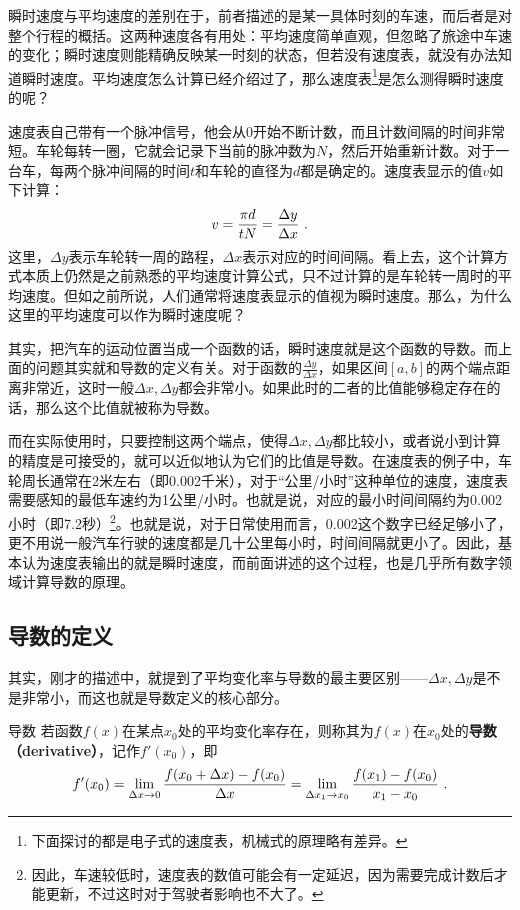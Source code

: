 瞬时速度与平均速度的差别在于，前者描述的是某一具体时刻的车速，而后者是对整个行程的概括。这两种速度各有用处：平均速度简单直观，但忽略了旅途中车速的变化；瞬时速度则能精确反映某一时刻的状态，但若没有速度表，就没有办法知道瞬时速度。平均速度怎么计算已经介绍过了，那么速度表\footnote{下面探讨的都是电子式的速度表，机械式的原理略有差异。}是怎么测得瞬时速度的呢？

速度表自己带有一个脉冲信号，他会从0开始不断计数，而且计数间隔的时间非常短。车轮每转一圈，它就会记录下当前的脉冲数为$N$，然后开始重新计数。对于一台车，每两个脉冲间隔的时间$t$和车轮的直径为$d$都是确定的。速度表显示的值$v$如下计算：
\begin{equation}
v={\pi d\over tN}=\frac{\Delta y}{\Delta x}~.
\end{equation}
这里，$\Delta y$表示车轮转一周的路程，$\Delta x$表示对应的时间间隔。看上去，这个计算方式本质上仍然是之前熟悉的平均速度计算公式，只不过计算的是车轮转一周时的平均速度。但如之前所说，人们通常将速度表显示的值视为瞬时速度。那么，为什么这里的平均速度可以作为瞬时速度呢？

其实，把汽车的运动位置当成一个函数的话，瞬时速度就是这个函数的导数。而上面的问题其实就和导数的定义有关。对于函数的$\displaystyle\frac{\Delta y}{\Delta x}$，如果区间$[a, b]$的两个端点距离非常近，这时一般$\Delta x,\Delta y$都会非常小。如果此时的二者的比值能够稳定存在的话，那么这个比值就被称为导数。

而在实际使用时，只要控制这两个端点，使得$\Delta x,\Delta y$都比较小，或者说小到计算的精度是可接受的，就可以近似地认为它们的比值是导数。在速度表的例子中，车轮周长通常在2米左右（即0.002千米），对于“公里/小时”这种单位的速度，速度表需要感知的最低车速约为1公里/小时。也就是说，对应的最小时间间隔约为0.002小时（即7.2秒）\footnote{因此，车速较低时，速度表的数值可能会有一定延迟，因为需要完成计数后才能更新，不过这时对于驾驶者影响也不大了。}。也就是说，对于日常使用而言，0.002这个数字已经足够小了，更不用说一般汽车行驶的速度都是几十公里每小时，时间间隔就更小了。因此，基本认为速度表输出的就是瞬时速度，而前面讲述的这个过程，也是几乎所有数字领域计算导数的原理。

\subsection{导数的定义}

其实，刚才的描述中，就提到了平均变化率与导数的最主要区别——$\Delta x,\Delta y$是不是非常小，而这也就是导数定义的核心部分。

\begin{definition}{导数}\label{def_HsDerv_1}
若函数$f(x)$在某点$x_0$处的平均变化率存在，则称其为$f(x)$在$x_0$处的\textbf{导数（derivative）}，记作$f'(x_0)$，即
\begin{equation}
f'(x_0)=\lim_{\Delta x\to 0}{f(x_0+\Delta x)-f(x_0)\over \Delta x}=\lim_{\Delta x_1\to x_0}{f(x_1)-f(x_0)\over x_1-x_0}~.
\end{equation}
\end{definition}

